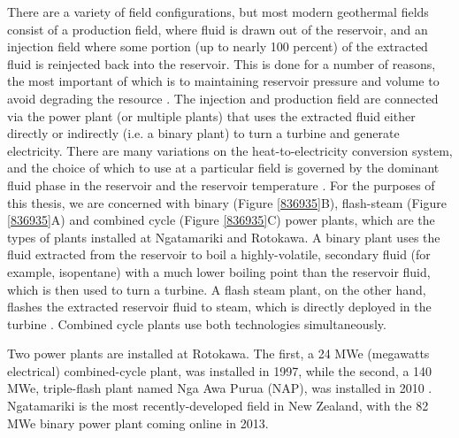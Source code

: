 There are a variety of field configurations, but most modern geothermal fields consist of a production field, where fluid is drawn out of the reservoir, and an injection field where some portion (up to nearly 100 percent) of the extracted fluid is reinjected back into the reservoir. This is done for a number of reasons, the most important of which is to maintaining reservoir pressure and volume to avoid degrading the resource \citep{Grant_2011}. The injection and production field are connected via the power plant (or multiple plants) that uses the extracted fluid either directly or indirectly (i.e. a binary plant) to turn a turbine and generate electricity. There are many variations on the heat-to-electricity conversion system, and the choice of which to use at a particular field is governed by the dominant fluid phase in the reservoir and the reservoir temperature \citep{DiPippo_2016}. For the purposes of this thesis, we are concerned with binary (Figure \ref{836935}B), flash-steam (Figure \ref{836935}A) and combined cycle (Figure \ref{836935}C) power plants, which are the types of plants installed at Ngatamariki and Rotokawa. A binary plant uses the fluid extracted from the reservoir to boil a highly-volatile, secondary fluid (for example, isopentane) with a much lower boiling point than the reservoir fluid, which is then used to turn a turbine. A flash steam plant, on the other hand, flashes the extracted reservoir fluid to steam, which is directly deployed in the turbine \citep{DiPippo_2016}. Combined cycle plants use both technologies simultaneously.

Two power plants are installed at Rotokawa. The first, a 24 MWe (megawatts electrical) combined-cycle plant, was installed in 1997, while the second, a 140 MWe, triple-flash plant named Nga Awa Purua (NAP), was installed in 2010 \citep{McNamara_2016}. Ngatamariki is the most recently-developed field in New Zealand, with the 82 MWe binary power plant coming online in 2013.

